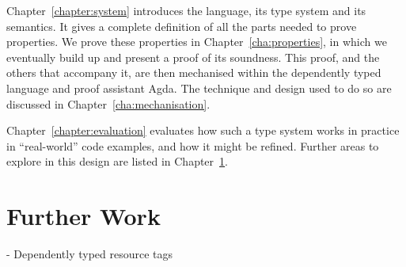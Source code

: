\documentclass{report}
\begin{document}
Chapter~\ref{chapter:system} introduces the language, its type system and its
semantics.  It gives a complete definition of all the parts needed to prove
properties.  We prove these properties in Chapter~\ref{cha:properties}, in
which we eventually build up and present a proof of its soundness. This proof,
and the others that accompany it, are then mechanised within the dependently
typed language and proof assistant Agda. The technique and design used to do so
are discussed in Chapter~\ref{cha:mechanisation}.

Chapter~\ref{chapter:evaluation} evaluates how such a type system works in
practice in ``real-world'' code examples, and how it might be refined. Further
areas to explore in this design are listed in Chapter~\ref{chapter:further-work}.











\chapter{Further Work}\label{chapter:further-work}

- Dependently typed resource tags





\end{document}
